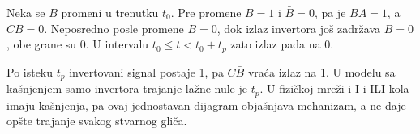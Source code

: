 
Neka se \(B\) promeni u trenutku \(t_0\). Pre promene \(B=1\) i \(\bar B=0\), pa je \(BA=1\), a \(C\bar B=0\). Neposredno posle promene \(B=0\), dok izlaz invertora još zadržava \(\bar B=0\), obe grane su 0. U intervalu \(t_0\leq t<t_0+t_p\) zato izlaz pada na 0.

Po isteku \(t_p\) invertovani signal postaje 1, pa \(C\bar B\) vraća izlaz na 1. U modelu sa kašnjenjem samo invertora trajanje lažne nule je \(t_p\). U fizičkoj mreži i I i ILI kola imaju kašnjenja, pa ovaj jednostavan dijagram objašnjava mehanizam, a ne daje opšte trajanje svakog stvarnog gliča.
